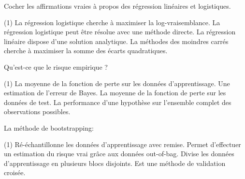 \documentclass[solutions]{../cc}
\begin{document}
	\begin{question}
		Cocher les affirmations vraies à propos des régression linéaires et logistiques.
		\begin{tasks}(1)
			\task La régression logistique cherche à maximiser la log-vraisemblance.
			\task La régression logistique peut être résolue avec une méthode directe.
			\task La régression linéaire dispose d'une solution analytique.
			\task La méthodes des moindres carrés cherche à maximiser la somme des écarts quadratiques.
		\end{tasks}
	\end{question}

	\begin{question}
		Qu'est-ce que le risque empirique ?
		\begin{tasks}(1)
			\task La moyenne de la fonction de perte sur les données d'apprentissage.
			\task Une estimation de l'erreur de Bayes.
			\task La moyenne de la fonction de perte sur les données de test.
			\task La performance d'une hypothèse sur l'ensemble complet des observations possibles.
		\end{tasks}
	\end{question}

	\begin{question}
		La méthode de bootstrapping:
		\begin{tasks}(1)
			\task Ré-échantillonne les données d'apprentissage avec remise.
			\task Permet d'effectuer un estimation du risque vrai grâce aux données out-of-bag.
			\task Divise les données d'apprentissage en plusieurs blocs disjoints.
			\task Est une méthode de validation croisée.
		\end{tasks}
	\end{question}
	
\end{document}
